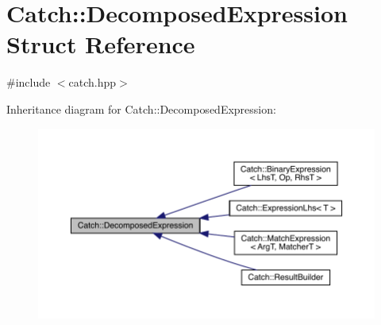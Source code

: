 \hypertarget{struct_catch_1_1_decomposed_expression}{}\section{Catch\+:\+:Decomposed\+Expression Struct Reference}
\label{struct_catch_1_1_decomposed_expression}


{\ttfamily \#include $<$catch.\+hpp$>$}



Inheritance diagram for Catch\+:\+:Decomposed\+Expression\+:
\nopagebreak
\begin{figure}[H]
\begin{center}
\leavevmode
\includegraphics[width=350pt]{struct_catch_1_1_decomposed_expression__inherit__graph}
\end{center}
\end{figure}
